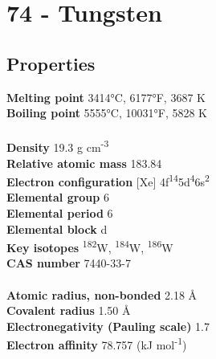 \section{74 - Tungsten}
\label{sec:elem-tungsten}
\subsection{Properties}
\textbf{Melting point} 3414°C, 6177°F, 3687 K\\
\textbf{Boiling point} 5555°C, 10031°F, 5828 K\\
\\
\textbf{Density} 19.3 g cm\textsuperscript{-3}\\
\textbf{Relative atomic mass} 183.84\\
\textbf{Electron configuration} [Xe] 4f\textsuperscript{14}5d\textsuperscript{4}6s\textsuperscript{2}\\
\textbf{Elemental group} 6\\
\textbf{Elemental period} 6\\
\textbf{Elemental block} d\\
\textbf{Key isotopes} \textsuperscript{182}W, \textsuperscript{184}W, \textsuperscript{186}W\\
\textbf{CAS number} 7440-33-7\\
\\
\textbf{Atomic radius, non-bonded} 2.18 Å\\
\textbf{Covalent radius} 1.50 Å\\
\textbf{Electronegativity (Pauling scale)} 1.7\\
\textbf{Electron affinity} 78.757 (kJ mol\textsuperscript{-1})\\